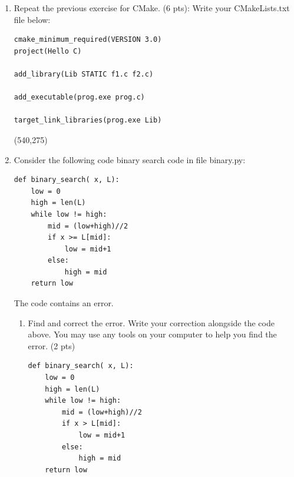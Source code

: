 \documentclass[10pt]{article}
\begin{document}
\begin{enumerate}
\begin{lstlisting}
clean:
	rm *.o prog libf.so

prog.exe: prog.o libf.a
	cc -o prog.exe prog.o libf.a

prog.o: prog.c
	cc -c prog.c -o prog.o

libf.a: f1.o f2.o
	ar -qc libf.a f1.o f2.o 
	
f1.o: f1.c
	cc -c f1.c -o f1.o

f2.o: f2.c
	cc -c f2.c -o f2.o
\end{lstlisting}
or
\begin{lstlisting}
all: prog.exe

clean:
	rm *.o prog.exe libf.a

prog.exe: prog.o libf.a
	cc -o prog.exe prog.o libf.a

prog.o: prog.c

libf.a: f1.o f2.o
	ar -qc libf.a f1.o f2.o

f1.o: f1.c

f2.o: f1.c
\end{lstlisting}
	
\else
\hspace*{-0.4in}\framebox(540,275){}
\fi

\item Repeat the previous exercise for CMake.  (6 pts):
\bigskip
Write your CMakeLists.txt file below:
\beginanswers
\begin{lstlisting}
cmake_minimum_required(VERSION 3.0)
project(Hello C)

add_library(Lib STATIC f1.c f2.c)

add_executable(prog.exe	prog.c)

target_link_libraries(prog.exe Lib)
\end{lstlisting}
\else
\hspace*{-0.4in}\framebox(540,275){}
\fi

\newpage

\item Consider the following code binary search code in file binary.py:
\begin{lstlisting}
def binary_search( x, L):
    low = 0
    high = len(L)
    while low != high:
        mid = (low+high)//2
        if x >= L[mid]:
            low = mid+1
        else:
            high = mid
    return low
\end{lstlisting}
\bigskip

The code contains an error.

\begin{enumerate}
	\item Find and correct the error. Write your correction alongside the code above. You may use any tools on your computer to help you find the error. (2 pts)
\beginanswers
\begin{lstlisting}
def binary_search( x, L):
    low = 0
    high = len(L)
    while low != high:
        mid = (low+high)//2
        if x > L[mid]:
            low = mid+1
        else:
            high = mid
    return low
\end{lstlisting}
\fi
	

\end{enumerate}
\end{enumerate}
\end{document}

